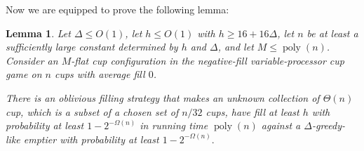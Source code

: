 \documentclass[twocolumn]{article}[10pt]
\DeclareMathOperator{\poly}{\text{poly}}
\newtheorem{lemma}{Lemma}
\begin{document}
Now we are equipped to prove the following lemma:
\begin{lemma}
  \label{lem:obliviousManyUnknownCups}
  Let $\Delta \le O(1)$, let $h \le O(1)$ with $h \ge 16+16\Delta$, let
  $n$ be at least a sufficiently large constant
  determined by $h$ and $\Delta$, and let $M \le \poly(n)$.
  Consider an $M$-flat cup configuration in the negative-fill
  variable-processor cup game on $n$ cups with average fill $0$.

  There is an oblivious filling strategy that makes an unknown
  collection of $\Theta(n)$ cup, which is a subset of a chosen set of $n/32$
  cups, have fill at least $h$ with probability at
  least $1-2^{-\Omega(n)}$ in running time $\poly(n)$ against a
  $\Delta$-greedy-like emptier with probability at least
  $1-2^{-\Omega(n)}.$

\end{lemma}
\end{document}
